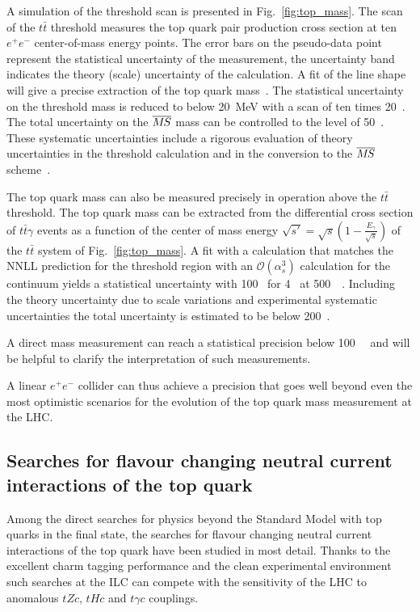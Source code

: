 A simulation of the threshold scan is presented in
Fig.~\ref{fig:top_mass}. The scan of the $t\bar t$ threshold measures the
top quark pair production cross section at ten $e^+e^-$ center-of-mass energy points. 
The error bars on the pseudo-data point represent the statistical uncertainty of
the measurement, the uncertainty band indicates the theory (scale) uncertainty 
of the calculation. A fit of the line shape will give
a precise extraction of the top quark mass~\cite{Martinez:2002st,Horiguchi:2013wra,Seidel:2013sqa}.
The statistical uncertainty on the threshold mass is reduced to 
below 20~MeV with a scan of ten times 20~\ifb. The total uncertainty 
on the $\msb$ mass can be controlled to the level
of 50~\MeV. These systematic uncertainties
include a rigorous evaluation of theory uncertainties in the 
threshold calculation and in the conversion
to the $\msb$ scheme~\cite{Simon:2016pwp}.

The top quark mass can also be measured precisely in operation above the $t\bar t$
threshold. The top quark mass can be extracted from the differential cross section of $t\bar t \gamma$  events as a function of the center of mass energy 
$\sqrt{s'} = \sqrt{s} ( 1 - \frac{E_{\gamma}}{\sqrt{s}})$ 
of the $t \bar t$ system of Fig.~\ref{fig:top_mass}. A fit with a calculation that matches the 
NNLL prediction for the threshold region with an $\mathcal{O} (\alpha_{s}^3)$ calculation for 
the continuum yields a statistical uncertainty with 100~\MeV{} for 4~\iab{} at 500~\GeV{}~\cite{Abramowicz:2018rjq}. Including the theory uncertainty due to scale variations
and experimental systematic uncertainties the total uncertainty is estimated to be below
200~\MeV. 

A direct mass 
measurement can reach a statistical precision below 100~\MeV{}~\cite{Seidel:2013sqa} and will 
be helpful to clarify the interpretation of such measurements.

A linear $e^+e^-$ collider
can thus achieve a precision that goes well beyond
even the most optimistic scenarios for the evolution 
of the top quark mass measurement at the LHC.

\subsection{Searches for flavour changing neutral current interactions of the top quark}
\label{subsec:top:fcnc}

Among the direct searches for physics beyond the Standard Model with top quarks 
in the final state, the searches for flavour changing neutral current interactions of 
the top quark have been studied in most detail. Thanks to the excellent charm
tagging performance and the clean experimental environment such searches at the ILC
can compete with the sensitivity of the LHC to anomalous $ t Z c$, $t H c$ and 
$t\gamma c$ couplings. 


